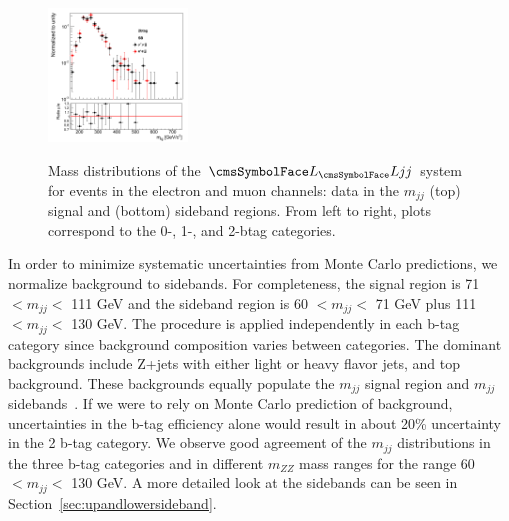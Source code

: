 \begin{figure}[htb]
\begin{center}
{\includegraphics[width=0.33\textwidth]{plots/mH_lim20_2btag-SB_NORM_LOG.png}
}
\caption{Mass distributions of the $\LL jj$ system for events in the electron and muon channels: data in the $m_{jj}$ (top) signal and (bottom) sideband regions. From left to right, plots correspond to the 0-, 1-, and 2-btag categories.
}
\label{fig:emuratios}
\end{center}
\end{figure}

In order to minimize systematic uncertainties from Monte Carlo predictions, we normalize background to sidebands. For completeness, the signal region is 71 $< m_{jj} <$ 111 GeV and the sideband region is 60 $< m_{jj} <$ 71 GeV plus 111 $< m_{jj} <$ 130 GeV. The procedure is applied independently in each b-tag category since background composition varies between categories. The dominant backgrounds include Z+jets with either light or heavy flavor jets, and top background. These backgrounds equally populate the $m_{jj}$ signal region and $m_{jj}$ sidebands~\cite{AN-11-388}.
If we were to rely on Monte Carlo prediction of background, uncertainties in the b-tag efficiency alone would result in about 20\% uncertainty in the 2 b-tag category. We observe good agreement of the $m_{jj}$ distributions in the three b-tag categories and in different $m_{ZZ}$ mass ranges for the range 60 $< m_{jj} <$ 130 GeV. A more detailed look at the sidebands can be seen in Section~\ref{sec:upandlowersideband}.

